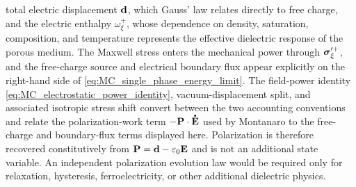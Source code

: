 total electric displacement \(\mathbf{d}\), which Gauss' law relates directly to
free charge, and the electric enthalpy \(\omega_\xi^+\), whose dependence on
density, saturation, composition, and temperature represents the effective
dielectric response of the porous medium.  The Maxwell stress enters the
mechanical power through \(\boldsymbol{\sigma}_\xi^{\prime+}\), and the free-charge
source and electrical boundary flux appear explicitly on the right-hand side
of \eqref{eq:MC_single_phase_energy_limit}.  The field-power identity
\eqref{eq:MC_electrostatic_power_identity}, vacuum-displacement split, and
associated isotropic stress shift convert between the two accounting
conventions and relate the polarization-work term
\(-\mbf P\cdot\phasedot{\mbf E}\) used by Montanaro to the free-charge and
boundary-flux terms displayed here.  Polarization is therefore recovered
constitutively from \(\mathbf{P}=\mathbf{d}-\varepsilon_0\mathbf{E}\) and is not an
additional state variable.  An independent polarization evolution law would be
required only for relaxation, hysteresis, ferroelectricity, or other
additional dielectric physics.

